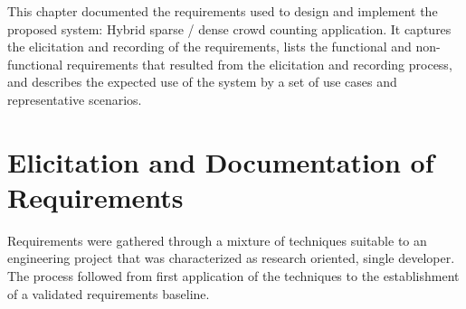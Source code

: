 \label{chap:requirements}

This chapter documented the requirements used to design and implement the proposed system: Hybrid sparse / dense crowd counting application. It captures the elicitation and recording of the requirements, lists the functional and non-functional requirements that resulted from the elicitation and recording process, and describes the expected use of the system by a set of use cases and representative scenarios.

\section{Elicitation and Documentation of Requirements}

Requirements were gathered through a mixture of techniques suitable to an engineering project that was characterized as research oriented, single developer. The process followed from first application of the techniques to the establishment of a validated requirements baseline.


